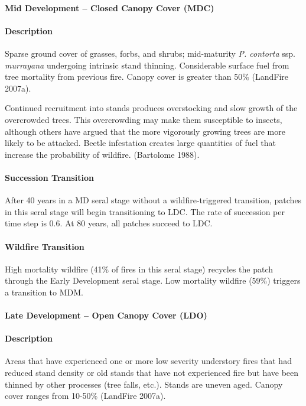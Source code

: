 \noindent\hrulefill

\paragraph{Mid Development – Closed Canopy Cover (MDC)}

\paragraph{Description} Sparse ground cover of grasses, forbs, and shrubs; mid-maturity \emph{P. contorta} ssp. \emph{murrayana} undergoing intrinsic stand thinning. Considerable surface fuel from tree mortality from previous fire. Canopy cover is greater than 50\% (LandFire 2007a).

Continued recruitment into stands produces overstocking and slow growth of the overcrowded trees. This overcrowding may make them susceptible to insects, although others have argued that the more vigorously growing trees are more likely to be attacked. Beetle infestation creates large quantities of fuel that increase the probability of wildfire. (Bartolome 1988).


\paragraph{Succession Transition} After 40 years in a MD seral stage without a wildfire-triggered transition, patches in this seral stage will begin transitioning to LDC. The rate of succession per time step is 0.6. At 80 years, all patches succeed to LDC.

\paragraph{Wildfire Transition} High mortality wildfire (41\% of fires in this seral stage) recycles the patch through the Early Development seral stage. Low mortality wildfire (59\%) triggers a transition to MDM.

\noindent\hrulefill


\paragraph{Late Development – Open Canopy Cover (LDO)}

\paragraph{Description} Areas that have experienced one or more low severity understory fires that had reduced stand density or old stands that have not experienced fire but have been thinned by other processes (tree falls, etc.). Stands are uneven aged. Canopy cover ranges from 10-50\% (LandFire 2007a).

